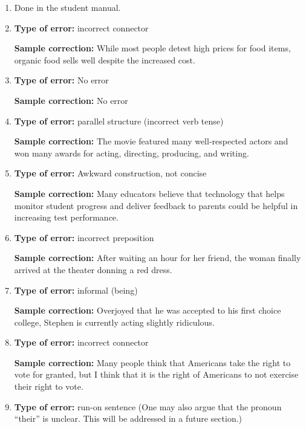 \begin{enumerate}
\item Done in the student manual. 

\item \textbf{Type of error:} incorrect connector

\bigskip 
\textbf{Sample correction:} While most people detest high prices for food items, organic food sells well despite the increased cost. 

\bigskip
\item \textbf{Type of error:} No error

\bigskip 
\textbf{Sample correction:} No error

\bigskip
\item \textbf{Type of error:} parallel structure (incorrect verb tense)

\bigskip 
\textbf{Sample correction:} The movie featured many well-respected actors and won many awards for acting, directing, producing, and writing. 

\bigskip
\item \textbf{Type of error:} Awkward construction, not concise

\bigskip 
\textbf{Sample correction:} Many educators believe that technology that helps monitor student progress and deliver feedback to parents could be helpful in increasing test performance. 

\bigskip
\item \textbf{Type of error:} incorrect preposition

\bigskip 
\textbf{Sample correction:} After waiting an hour for her friend, the woman finally arrived at the theater donning a red dress. 

\bigskip
\item \textbf{Type of error:} informal (being)

\bigskip 
\textbf{Sample correction:} Overjoyed that he was accepted to his first choice college, Stephen is currently acting slightly ridiculous. 

\bigskip
\item \textbf{Type of error:} incorrect connector

\bigskip 
\textbf{Sample correction:} Many people think that Americans take the right to vote for granted, but I think that it is the right of Americans to not exercise their right to vote. 

\bigskip
\item \textbf{Type of error:} run-on sentence (One may also argue that the pronoun ``their'' is unclear. This will be addressed in a future section.)


\end{enumerate}

